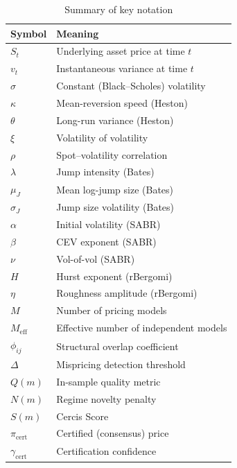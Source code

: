 \documentclass[11pt,a4paper]{article}
\theoremstyle{plain}
\theoremstyle{definition}
\theoremstyle{remark}
\begin{document}
\begin{table}[H]
\centering
\caption{Summary of key notation}
\label{tab:notation}
\begin{tabular}{ll}
\toprule
Symbol & Meaning \\
\midrule
$S_t$       & Underlying asset price at time $t$ \\
$v_t$       & Instantaneous variance at time $t$ \\
$\sigma$    & Constant (Black--Scholes) volatility \\
$\kappa$    & Mean-reversion speed (Heston) \\
$\theta$    & Long-run variance (Heston) \\
$\xi$       & Volatility of volatility \\
$\rho$      & Spot--volatility correlation \\
$\lambda$   & Jump intensity (Bates) \\
$\mu_J$     & Mean log-jump size (Bates) \\
$\sigma_J$  & Jump size volatility (Bates) \\
$\alpha$     & Initial volatility (SABR) \\
$\beta$     & CEV exponent (SABR) \\
$\nu$       & Vol-of-vol (SABR) \\
$H$         & Hurst exponent (rBergomi) \\
$\eta$      & Roughness amplitude (rBergomi) \\
$M$         & Number of pricing models \\
$M_{\text{eff}}$ & Effective number of independent models \\
$\phi_{ij}$ & Structural overlap coefficient \\
$\Delta$    & Mispricing detection threshold \\
$Q(m)$      & In-sample quality metric \\
$N(m)$      & Regime novelty penalty \\
$S(m)$      & Cercis Score \\
$\pi_{\text{cert}}$ & Certified (consensus) price \\
$\gamma_{\text{cert}}$ & Certification confidence \\
\bottomrule
\end{tabular}
\end{table}
\end{document}
